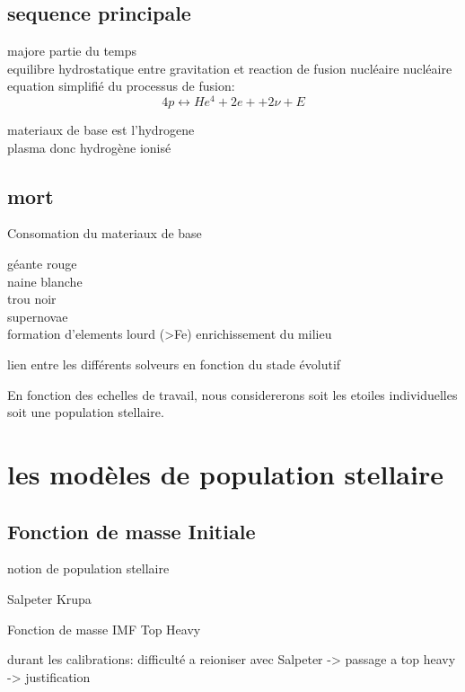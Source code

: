 \subsection{sequence principale}
majore partie du temps\\

equilibre hydrostatique entre gravitation et reaction de fusion nucléaire nucléaire\\

equation simplifié du processus de fusion:
\begin{equation}
4p \leftrightarrow He^4 + 2e+ + 2\nu + E
\end{equation}




materiaux de base est l'hydrogene\\
plasma donc hydrogène ionisé 


\subsection{mort}
Consomation du materiaux de base

géante rouge\\
naine blanche\\
trou noir\\
supernovae\\
formation d'elements lourd (>Fe)
enrichissement du milieu



lien entre les différents solveurs en fonction du stade évolutif

En fonction des echelles de travail, nous considererons soit les etoiles individuelles soit une population stellaire.

\section{les modèles de population stellaire}

\subsection{Fonction de masse Initiale}
notion de population stellaire

Salpeter
Krupa

Fonction de masse IMF Top Heavy

durant les calibrations: difficulté a reioniser avec Salpeter -> passage a top heavy -> justification 

